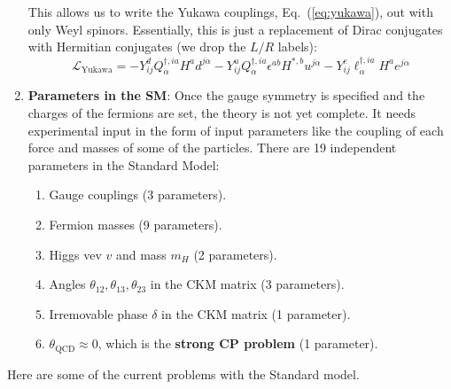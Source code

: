\documentclass[11pt, oneside]{article}   	%
\theoremstyle{definition}
\numberwithin{equation}{subsection}		%
\begin{document}
\begin{enumerate}
\begin{equation}
	\end{equation}
	This allows us to write the Yukawa couplings, Eq.~(\ref{eq:yukawa}), out with only Weyl spinors. Essentially, this is just a replacement 
	of Dirac conjugates with Hermitian conjugates (we drop the $L/R$ labels):
	\begin{equation}
		\mathcal L_\mathrm{Yukawa} = -Y_{ij}^d Q^{\dagger, ia}_{\dot\alpha} H^a d^{j\dot\alpha} - Y_{ij}^u Q^{\dagger, ia}_{\dot\alpha} 
		\epsilon^{ab} H^{*, b} u^{j \dot\alpha} - Y_{ij}^e \ell^{\dagger, ia}_{\dot\alpha} H^a e^{j\dot\alpha}
	\end{equation}
	\item \textbf{Parameters in the SM}: Once the gauge symmetry is specified and the charges of the 
	fermions are set, the theory is not yet complete. It needs experimental input in the form of input parameters like the coupling of 
	each force and masses of some of the particles. There are 19 independent parameters in the Standard Model:
\begin{enumerate}
	\item Gauge couplings (3 parameters).
	\item Fermion masses (9 parameters).
	\item Higgs vev $v$ and mass $m_H$ (2 parameters). 
	\item Angles $\theta_{12}, \theta_{13}, \theta_{23}$ in the CKM matrix (3 parameters).
	\item Irremovable phase $\delta$ in the CKM matrix (1 parameter). 
	\item $\theta_\mathrm{QCD}\approx 0$, which is the \textbf{strong CP problem} (1 parameter).
\end{enumerate}
\end{enumerate}
Here are some of the current problems with the Standard model. 
\end{document}
